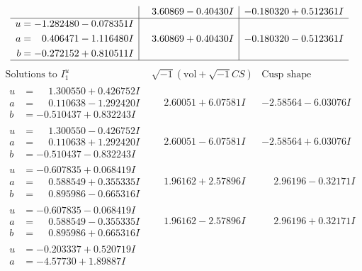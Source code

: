\documentclass[1p]{elsarticle_modified}
\theoremstyle{definition}
\newcommand{\I}{\sqrt{-1}}
\begin{document}
$$\begin{array}{c|c|c}
 & \phantom{-}3.60869 - 0.40430 I & -0.180320 + 0.512361 I \\ \hline\begin{aligned}
u &= -1.282480 - 0.078351 I \\
a &= \phantom{-}0.406471 - 1.116480 I \\
b &= -0.272152 + 0.810511 I\end{aligned}
 & \phantom{-}3.60869 + 0.40430 I & -0.180320 - 0.512361 I\\
 \hline 
 \end{array}$$\newpage$$\begin{array}{c|c|c}  
\text{Solutions to }I^u_{1}& \I (\text{vol} + \sqrt{-1}CS) & \text{Cusp shape}\\
 \hline 
\begin{aligned}
u &= \phantom{-}1.300550 + 0.426752 I \\
a &= \phantom{-}0.110638 - 1.292420 I \\
b &= -0.510437 + 0.832243 I\end{aligned}
 & \phantom{-}2.60051 + 6.07581 I & -2.58564 - 6.03076 I \\ \hline\begin{aligned}
u &= \phantom{-}1.300550 - 0.426752 I \\
a &= \phantom{-}0.110638 + 1.292420 I \\
b &= -0.510437 - 0.832243 I\end{aligned}
 & \phantom{-}2.60051 - 6.07581 I & -2.58564 + 6.03076 I \\ \hline\begin{aligned}
u &= -0.607835 + 0.068419 I \\
a &= \phantom{-}0.588549 + 0.355335 I \\
b &= \phantom{-}0.895986 - 0.665316 I\end{aligned}
 & \phantom{-}1.96162 + 2.57896 I & \phantom{-}2.96196 - 0.32171 I \\ \hline\begin{aligned}
u &= -0.607835 - 0.068419 I \\
a &= \phantom{-}0.588549 - 0.355335 I \\
b &= \phantom{-}0.895986 + 0.665316 I\end{aligned}
 & \phantom{-}1.96162 - 2.57896 I & \phantom{-}2.96196 + 0.32171 I \\ \hline\begin{aligned}
u &= -0.203337 + 0.520719 I \\
a &= -4.57730 + 1.89887 I \\

\end{aligned}
\end{array}$$
\end{document}
